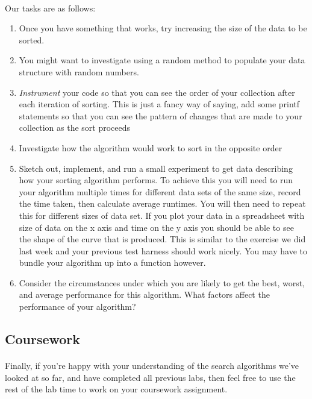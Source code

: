\documentclass[10pt, a4paper, twosize]{article}
\begin{document}



\paragraph{} Our tasks are as follows:
\begin{enumerate}
\item Once you have something that works, try increasing the size of the data to be sorted.
\item You might want to investigate using a random method to populate your data structure with random numbers.
\item \emph{Instrument} your code so that you can see the order of your collection after each iteration of sorting. This is just a fancy way of saying, add some printf statements so that you can see the pattern of changes that are made to your collection as the sort proceeds
\item Investigate how the algorithm would work to sort in the opposite order
\item Sketch out, implement, and run a small experiment to get data describing how your sorting algorithm performs. To achieve this you will need to run your algorithm multiple times for different data sets of the same size, record the time taken, then calculate average runtimes. You will then need to repeat this for different sizes of data set. If you plot your data in a spreadsheet with size of data on the x axis and time on the y axis you should be able to see the shape of the curve that is produced. This is similar to the exercise we did last week and your previous test harness should work nicely. You may have to bundle your algorithm up into a function however.
\item Consider the circumstances under which you are likely to get the best, worst, and average performance for this algorithm. What factors affect the performance of your algorithm?
\end{enumerate}




\subsection{Coursework}

\paragraph{} Finally, if you're happy with your understanding of the search algorithms we've looked at so far, and have completed all previous labs, then feel free to use the rest of the lab time to work on your coursework assignment.






\end{document}
